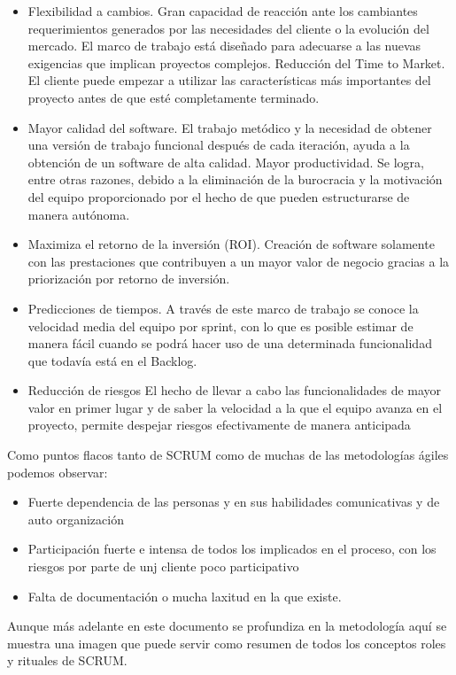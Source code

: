 \documentclass[../pfc.tex]{subfiles}
\begin{document}
	\begin{itemize} 
		\item Flexibilidad a cambios. Gran capacidad de reacción ante los cambiantes requerimientos generados por las necesidades del cliente o la evolución del mercado. El marco de trabajo está diseñado para adecuarse a las nuevas exigencias que implican proyectos complejos.
		Reducción del Time to Market. El cliente puede empezar a utilizar las características más importantes del proyecto antes de que esté completamente terminado. 
		\item Mayor calidad del software. El trabajo metódico y la necesidad de obtener una versión de trabajo funcional después de cada iteración, ayuda a la obtención de un software de alta calidad.
		Mayor productividad. Se logra, entre otras razones, debido a la eliminación de la burocracia y la motivación del equipo proporcionado por el hecho de que pueden estructurarse de manera autónoma.
		\item Maximiza el retorno de la inversión (ROI). Creación de software solamente con las prestaciones que contribuyen a un mayor valor de negocio gracias a la priorización por retorno de inversión.
		\item Predicciones de tiempos. A través de este marco de trabajo se conoce la velocidad media del equipo por sprint, con lo que es posible estimar de manera fácil cuando se podrá hacer uso de una determinada funcionalidad que todavía está en el Backlog.
		\item Reducción de riesgos El hecho de llevar a cabo las funcionalidades de mayor valor en primer lugar y de saber la velocidad a la que el equipo avanza en el proyecto, permite despejar riesgos efectivamente de manera anticipada
	\end{itemize}
	
	Como puntos flacos tanto de SCRUM como de muchas de las metodologías ágiles podemos observar:
	
		\begin{itemize} 
			\item Fuerte dependencia de las personas y en sus habilidades comunicativas y de auto organización
			\item Participación fuerte e intensa de todos los implicados en el proceso, con los riesgos por parte de unj cliente poco participativo
			\item Falta de documentación o mucha laxitud en la que existe.
		\end{itemize}
	
	Aunque más adelante en este documento se profundiza en la metodología aquí se muestra una imagen que puede servir como resumen de todos los conceptos roles y rituales de SCRUM.
	
\end{document}

